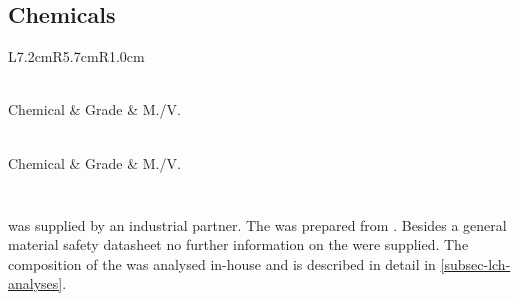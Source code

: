 \subsection{Chemicals}
{
\setlength{\tabcolsep}{5pt}
\begin{longtable}{L{7.2cm}R{5.7cm}R{1.0cm}}
	\caption[List of Chemicals Used in This Work]{Chemicals used for the production of data presented in this work. Chemicals are roughly sorted alphabetically in ascending order. For most chemicals given here, lot information and the article number are available on request. Abbreviations: M./V.: Manufacturer or vendor.\label{tbl-mat-chem}}\\
	\toprule
	{Chemical} & {Grade} & {M./V.} \\
	\hline \endfirsthead
	\caption[]{\textit{continued from the previous page}} \\
	\toprule
	{Chemical} & {Grade} & {M./V.} \\
	\hline \endhead
	\hline
	 \\
	\endfoot
	\bottomrule
	\endlastfoot
\end{longtable}
}

\subsubsection{\LCH{}\label{subsec-mam-chem-lch}}
\LCh{} was supplied by an industrial partner. The \lch{} was prepared from \lcbm{}. Besides a general material safety datasheet no further information on the \lch{} were supplied. The composition of the \lch{} was analysed in-house and is described in detail in \vref{subsec-lch-analyses}.

